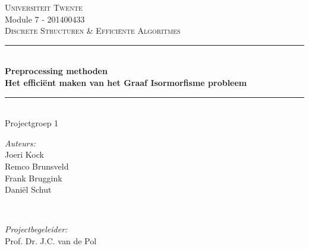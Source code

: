 \documentclass{article}
\begin{document}

\begin{titlepage}
		\newcommand{\HRule}{\rule{\linewidth}{0.5mm}}
		\center 						%


		\textsc{\large Universiteit Twente}\\[1.5cm]
		Module 7 - 201400433\\
		\vspace{5mm}
		\textsc{\Large Discrete Structuren \& Effici\"ente Algoritmes}\\[0.5cm]
		\vspace{15mm}


		\HRule \\[0.4cm]
		{ \huge \bfseries Preprocessing methoden}\\[0.4cm]
		{ \large \bfseries Het effici\"ent maken van het Graaf Isormorfisme probleem}\\[0.4cm]
		\HRule \\[1.5cm]
		 

		Projectgroep 1\\
		\vspace{10mm}
		\begin{minipage}{0.4\textwidth}
		\begin{flushleft} \large
		\emph{Auteurs:}\\
		Joeri Kock\\
		Remco Brunsveld\\
		Frank Bruggink\\
		Dani\"el Schut
		\end{flushleft}
		\end{minipage}
		~
		\begin{minipage}{0.4\textwidth}
		\begin{flushright} \large
		\emph{Projectbegeleider:} \\
		Prof. Dr. J.C. van de Pol
		\end{flushright}
		\end{minipage}\\[4cm]


\end{titlepage}
\end{document}
